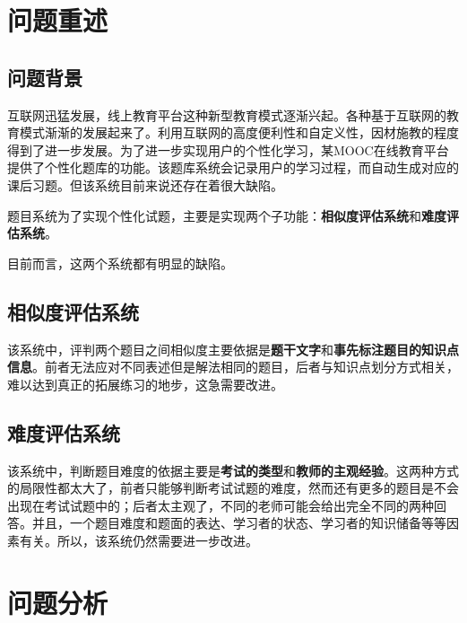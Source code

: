 \setcounter{page}{1}    %

%
%

\section{问题重述}

\subsection{问题背景}

互联网迅猛发展，线上教育平台这种新型教育模式逐渐兴起。各种基于互联网的教育模式渐渐的发展起来了。利用互联网的高度便利性和自定义性，因材施教的程度得到了进一步发展。为了进一步实现用户的个性化学习，某\linebreak MOOC在线教育平台提供了个性化题库的功能。该题库系统会记录用户的学习过程，而自动生成对应的课后习题。但该系统目前来说还存在着很大缺陷。

题目系统为了实现个性化试题，主要是实现两个子功能：\textbf{相似度评估系统}和\textbf{难度评估系统}。

目前而言，这两个系统都有明显的缺陷。

\subsection{相似度评估系统}

该系统中，评判两个题目之间相似度主要依据是\textbf{题干文字}和\textbf{事先标注题目的知识点信息}。前者无法应对不同表述但是解法相同的题目，后者与知识点划分方式相关，难以达到真正的拓展练习的地步，这急需要改进。

\subsection{难度评估系统}

该系统中，判断题目难度的依据主要是\textbf{考试的类型}和\textbf{教师的主观经验}。这两种方式的局限性都太大了，前者只能够判断考试试题的难度，然而还有更多的题目是不会出现在考试试题中的；后者太主观了，不同的老师可能会给出完全不同的两种回答。并且，一个题目难度和题面的表达、学习者的状态、学习者的知识储备等等因素有关。所以，该系统仍然需要进一步改进。

\section{问题分析}

